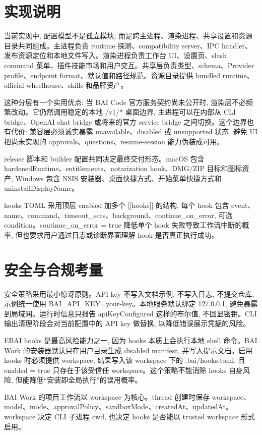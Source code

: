 \section{实现说明}
当前实现中, 配置模型不是孤立模块, 而是跨主进程、渲染进程、共享设置和资源目录共同组成。主进程负责 runtime 探测、compatibility server、IPC handler、发布资源定位和本地文件写入。渲染进程负责工作台 UI、设置页、slash command 菜单、插件技能市场和用户交互。共享层负责类型、schema、Provider profile、endpoint format、默认值和路径规范。资源目录提供 bundled runtime、official wheelhouse、skills 和品牌资产。

这种分层有一个实用优点: 当 BAI Code 官方服务契约尚未公开时, 渲染层不必频繁改动。它仍然调用稳定的本地 /v1/* 桌面边界, 主进程可以在内部从 CLI bridge、OpenAI chat bridge 或将来的官方 service bridge 之间切换。这个边界也有代价: 兼容层必须诚实暴露 unavailable、disabled 或 unsupported 状态, 避免 UI 把尚未实现的 approvals、questions、resume-session 能力伪装成可用。

release 脚本和 builder 配置共同决定最终交付形态。macOS 包含 hardenedRuntime、entitlements、notarization hook、DMG/ZIP 目标和图标资产, Windows 包含 NSIS 安装器、桌面快捷方式、开始菜单快捷方式和 uninstallDisplayName。

hooks TOML 采用顶层 enabled 加多个 [[hooks]] 的结构, 每个 hook 包含 event、name、command、timeout\_secs、background、continue\_on\_error, 可选 condition。continue\_on\_error = true 降低单个 hook 失败导致工作流中断的概率, 但也要求用户通过日志或诊断界面理解 hook 是否真正执行成功。

\section{安全与合规考量}
安全策略采用最小惊讶原则。API key 不写入文档示例, 不写入日志, 不提交仓库, 示例统一使用 BAI\_API\_KEY=your-key。本地服务默认绑定 127.0.0.1, 避免暴露到局域网。运行时信息只报告 apiKeyConfigured 这样的布尔值, 不回显密钥。CLI 输出清理阶段会对当前配置中的 API key 做替换, 以降低错误展示凭据的风险。

EBAI hooks 是最高风险能力之一, 因为 hooks 本质上会执行本地 shell 命令。BAI Work 的安装器默认只在用户目录生成 disabled manifest, 并写入提示文档。启用 hooks 时必须提供 workspace, 结果写入该 workspace 下的 .bai/hooks.toml, 且 enabled = true 只存在于该受信任 workspace。这个策略不能消除 hooks 自身风险, 但能降低“安装即全局执行”的误用概率。

BAI Work 的项目工作流以 workspace 为核心。thread 创建时保存 workspace、model、mode、approvalPolicy、sandboxMode、createdAt、updatedAt。workspace 决定 CLI 子进程 cwd, 也决定 hooks 是否能以 trusted workspace 形式启用。

